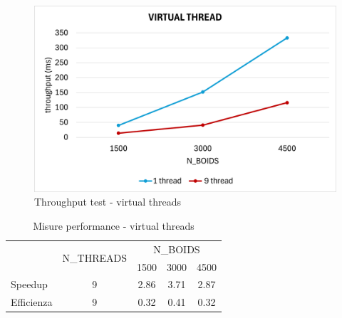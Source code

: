 \documentclass[a4paper,12pt]{report}
\begin{document}
\begin{figure}[H]
    \centering
    \includegraphics[width=\linewidth]{figures/virtualthread_test.png}
    \caption{\centering Throughput test - virtual threads}
    \label{fig:throughput-test-virtual-threads}
\end{figure}

\begin{table}[!htb]
    \renewcommand{\arraystretch}{1.5}
    \centering
    \begin{tabular}{|l|c|ccc|}
        \hline
        \multicolumn{1}{|c|}{} & \multirow{2}{*}{N\_THREADS} & \multicolumn{3}{c|}{N\_BOIDS}                                \\ \cline{3-5} 
        \multicolumn{1}{|c|}{} &                          & \multicolumn{1}{c|}{1500} & \multicolumn{1}{c|}{3000} & 4500 \\ \hline
        Speedup                & 9                        & \multicolumn{1}{c|}{2.86} & \multicolumn{1}{c|}{3.71} & 2.87 \\ \hline
        Efficienza             & 9                        & \multicolumn{1}{c|}{0.32} & \multicolumn{1}{c|}{0.41} & 0.32 \\ \hline
    \end{tabular}
    \caption{Misure performance - virtual threads}
    \label{table:performance_virtual_threads}
\end{table}

\end{document}
